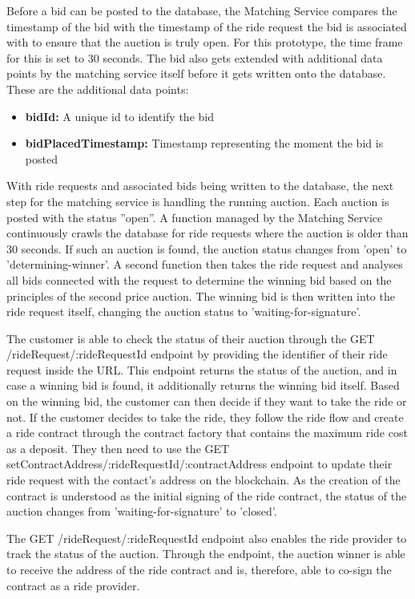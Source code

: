 Before a bid can be posted to the database, the Matching Service compares the timestamp of the bid with the timestamp of the ride request the bid is associated with to ensure that the auction is truly open. For this prototype, the time frame for this is set to 30 seconds. The bid also gets extended with additional data points by the matching service itself before it gets written onto the database. These are the additional data points:

\begin{itemize}
    \item \textbf{bidId:} A unique id to identify the bid
    \item \textbf{bidPlacedTimestamp:} Timestamp representing the moment the bid is posted
\end{itemize}

With ride requests and associated bids being written to the database, the next step for the matching service is handling the running auction. Each auction is posted with the status ''open''. A function managed by the Matching Service continuously crawls the database for ride requests where the auction is older than 30 seconds. If such an auction is found, the auction status changes from 'open' to 'determining-winner'. A second function then takes the ride request and analyses all bids connected with the request to determine the winning bid based on the principles of the second price auction. The winning bid is then written into the ride request itself, changing the auction status to 'waiting-for-signature'. 

The customer is able to check the status of their auction through the GET /rideRequest/:rideRequestId endpoint by providing the identifier of their ride request inside the URL. This endpoint returns the status of the auction, and in case a winning bid is found, it additionally returns the winning bid itself. Based on the winning bid, the customer can then decide if they want to take the ride or not. If the customer decides to take the ride, they follow the ride flow and create a ride contract through the contract factory that contains the maximum ride cost as a deposit. They then need to use the GET setContractAddress/:rideRequestId/:contractAddress endpoint to update their ride request with the contact's address on the blockchain. As the creation of the contract is understood as the initial signing of the ride contract, the status of the auction changes from 'waiting-for-signature' to 'closed'. 

The GET /rideRequest/:rideRequestId endpoint also enables the ride provider to track the status of the auction. Through the endpoint, the auction winner is able to receive the address of the ride contract and is, therefore, able to co-sign the contract as a ride provider.

